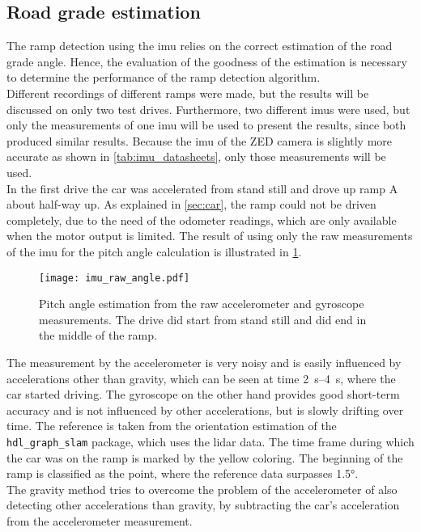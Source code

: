 \subsection{Road grade estimation}
The ramp detection using the \gls{imu} relies on the correct estimation of the road grade angle.
Hence, the evaluation of the goodness of the estimation is necessary to determine the performance of the ramp detection algorithm.\\
Different recordings of different ramps were made, but the results will be discussed on only two test drives.
Furthermore, two different \glspl{imu} were used, but only the measurements of one \gls{imu} will be used to present the results, since both produced similar results.
Because the \gls{imu} of the ZED camera is slightly more accurate as shown in \cref{tab:imu_datasheets}, only those measurements will be used.\\
In the first drive the car was accelerated from stand still and drove up ramp A about half-way up.
As explained in \cref{sec:car}, the ramp could not be driven completely, due to the need of the odometer readings, which are only available when the motor output is limited.
The result of using only the raw measurements of the \gls{imu} for the pitch angle calculation is illustrated in \cref{fig:imu_raw_angle}.
\begin{figure}[htb]
	\centering
	\texttt{[image: imu\_raw\_angle.pdf]}
	\caption[Angle estimation using raw measurements]{Pitch angle estimation from the raw accelerometer and gyroscope measurements. The drive did start from stand still and did end in the middle of the ramp.}
	\label{fig:imu_raw_angle}
\end{figure}
The measurement by the accelerometer is very noisy and is easily influenced by accelerations other than gravity, which can be seen at time \SIrange{2}{4}{\second}, where the car started driving.
The gyroscope on the other hand provides good short-term accuracy and is not influenced by other accelerations, but is slowly drifting over time.
The reference is taken from the orientation estimation of the \texttt{hdl\_graph\_slam} package, which uses the \gls{lidar} data.
The time frame during which the car was on the ramp is marked by the yellow coloring.
The beginning of the ramp is classified as the point, where the reference data surpasses \ang{1.5}.\\
The gravity method tries to overcome the problem of the accelerometer of also detecting other accelerations than gravity, by subtracting the car's acceleration from the accelerometer measurement.
